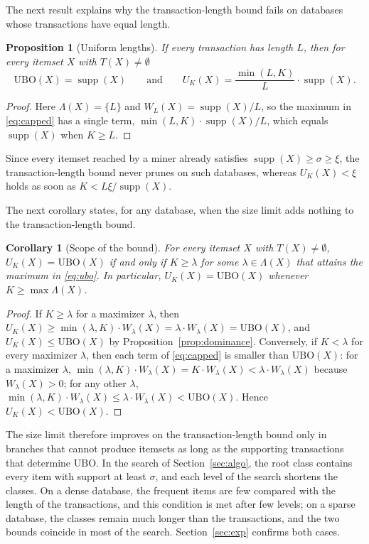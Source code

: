 \documentclass[pdflatex,sn-mathphys,Numbered]{sn-jnl}
\theoremstyle{thmstyleone}
\newtheorem{proposition}[theorem]{Proposition}
\newtheorem{corollary}[theorem]{Corollary}
\theoremstyle{thmstyletwo}
\theoremstyle{thmstylethree}
\newcommand{\supp}{\operatorname{supp}}
\newcommand{\Ubo}{\mathrm{UBO}}
\newcommand{\Ucap}{U}
\begin{document}
The next result explains why the transaction-length bound fails on databases whose transactions have equal length.

\begin{proposition}[Uniform lengths]\label{prop:uniform}
If every transaction has length $L$, then for every itemset $X$ with $T(X) \ne \emptyset$
\[
\Ubo(X) = \supp(X) \qquad \text{and} \qquad \Ucap_K(X) = \frac{\min(L, K)}{L} \cdot \supp(X).
\]
\end{proposition}
\begin{proof}
Here $\Lambda(X) = \{L\}$ and $W_L(X) = \supp(X)/L$, so the maximum in \eqref{eq:capped} has a single term, $\min(L,K) \cdot \supp(X)/L$, which equals $\supp(X)$ when $K \ge L$.
\end{proof}

Since every itemset reached by a miner already satisfies $\supp(X) \ge \sigma \ge \xi$, the transaction-length bound never prunes on such databases, whereas $\Ucap_K(X) < \xi$ holds as soon as $K < L \xi / \supp(X)$.

The next corollary states, for any database, when the size limit adds nothing to the transaction-length bound.

\begin{corollary}[Scope of the bound]\label{cor:scope}
For every itemset $X$ with $T(X) \ne \emptyset$, $\Ucap_K(X) = \Ubo(X)$ if and only if $K \ge \lambda$ for some $\lambda \in \Lambda(X)$ that attains the maximum in \eqref{eq:ubo}. In particular, $\Ucap_K(X) = \Ubo(X)$ whenever $K \ge \max \Lambda(X)$.
\end{corollary}
\begin{proof}
If $K \ge \lambda$ for a maximizer $\lambda$, then $\Ucap_K(X) \ge \min(\lambda, K) \cdot W_\lambda(X) = \lambda \cdot W_\lambda(X) = \Ubo(X)$, and $\Ucap_K(X) \le \Ubo(X)$ by Proposition~\ref{prop:dominance}. Conversely, if $K < \lambda$ for every maximizer $\lambda$, then each term of \eqref{eq:capped} is smaller than $\Ubo(X)$: for a maximizer $\lambda$, $\min(\lambda,K) \cdot W_\lambda(X) = K \cdot W_\lambda(X) < \lambda \cdot W_\lambda(X)$ because $W_\lambda(X) > 0$; for any other $\lambda$, $\min(\lambda,K) \cdot W_\lambda(X) \le \lambda \cdot W_\lambda(X) < \Ubo(X)$. Hence $\Ucap_K(X) < \Ubo(X)$.
\end{proof}

The size limit therefore improves on the transaction-length bound only in branches that cannot produce itemsets as long as the supporting transactions that determine $\Ubo$. In the search of Section~\ref{sec:algo}, the root class contains every item with support at least $\sigma$, and each level of the search shortens the classes. On a dense database, the frequent items are few compared with the length of the transactions, and this condition is met after few levels; on a sparse database, the classes remain much longer than the transactions, and the two bounds coincide in most of the search. Section~\ref{sec:exp} confirms both cases.
\end{document}
